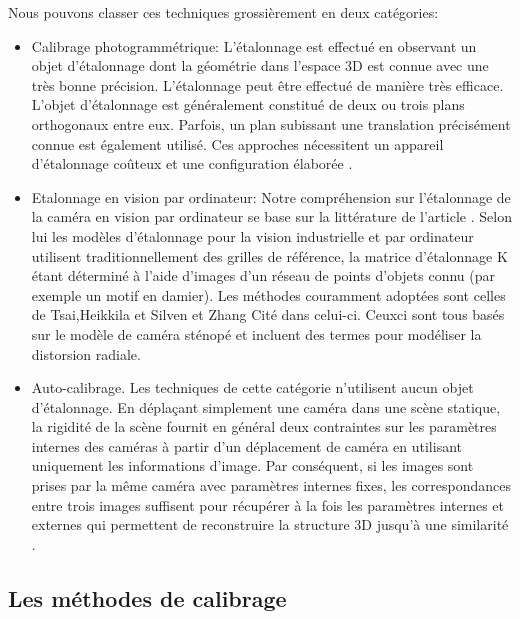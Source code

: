  Nous pouvons classer ces techniques grossièrement en deux catégories:\\
 \begin{itemize}
 \item Calibrage photogrammétrique: L'étalonnage est effectué en observant un objet d'étalonnage dont la géométrie dans l'espace 3D est connue avec une très bonne précision. L'étalonnage peut être effectué de manière très efficace. L'objet d'étalonnage est généralement constitué de deux ou trois plans orthogonaux entre eux. Parfois, un plan subissant une translation précisément connue est également utilisé. Ces approches nécessitent un appareil d'étalonnage coûteux et une configuration élaborée \cite{zhengyou_zhang_flexible_1999}.\\
 
 \item Etalonnage en vision par ordinateur: Notre compréhension sur l'étalonnage de la caméra en vision par ordinateur se base sur la littérature de l'article \cite{remondino_digital_2006}. Selon lui les modèles d'étalonnage pour la vision industrielle et par ordinateur utilisent traditionnellement des grilles de référence, la matrice d'étalonnage K étant déterminé à l'aide d'images d'un réseau de points d'objets connu (par exemple un motif en damier). Les méthodes couramment adoptées sont celles de Tsai,Heikkila et Silven  et Zhang \cite{zhengyou_zhang_flexible_1999} Cité dans celui-ci. Ceux­ci sont tous basés sur le modèle de caméra sténopé et incluent des termes pour modéliser la distorsion radiale.\\
 
 \item Auto-calibrage. Les techniques de cette catégorie n’utilisent aucun objet d’étalonnage. En déplaçant simplement une caméra dans une scène statique, la rigidité de la scène fournit en général deux contraintes sur les paramètres internes des caméras à partir d'un déplacement de caméra en utilisant uniquement les informations d'image. Par conséquent, si les images sont prises par la même caméra avec paramètres internes fixes, les correspondances entre trois images suffisent pour récupérer à la fois les paramètres internes et externes qui permettent de reconstruire la structure 3D jusqu'à une similarité \cite{zhengyou_zhang_flexible_1999}.\\
\end{itemize}

\subsection{Les méthodes de calibrage}

